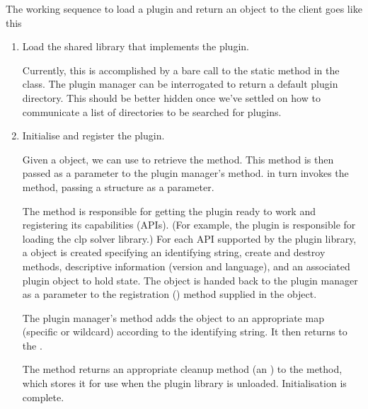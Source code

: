 \documentclass{article}
\begin{document}
The working sequence to load a plugin and return an object to the client goes
like this
\begin{enumerate}
  \item
  Load the shared library that implements the plugin.

  Currently, this is accomplished by a bare call to the static 
  method in the  class.
  The plugin manager can be interrogated to return a default plugin directory.
  This should be better hidden once we've settled on how to communicate a list
  of directories to be searched for plugins.

  \item
  Initialise and register the plugin.

  Given a  object, we can use  to
  retrieve the  method.
  This method is then passed as a parameter to the plugin manager's
   method.
   in turn invokes the  method,
  passing a  structure as a parameter.


  The  method is responsible for getting the plugin ready to
  work and registering its capabilities (APIs).
  (For example, the  plugin is responsible for loading the clp
  solver library.)
  For each API supported by the plugin library, a
   object
  is created specifying an identifying string, create and destroy methods,
  descriptive information (version and language), and an associated plugin
  object to hold state.
  The  object is handed back to the plugin manager
  as a parameter to the registration () method
  supplied in the  object.

  The plugin manager's  method adds the
   object to an appropriate map (specific or wildcard)
  according to the identifying string.
  It then returns to the .

  The  method returns an appropriate cleanup method (an
  ) to the  method, which stores it
  for use when the plugin library is unloaded.
  Initialisation is complete.


\end{enumerate}
\end{document}
